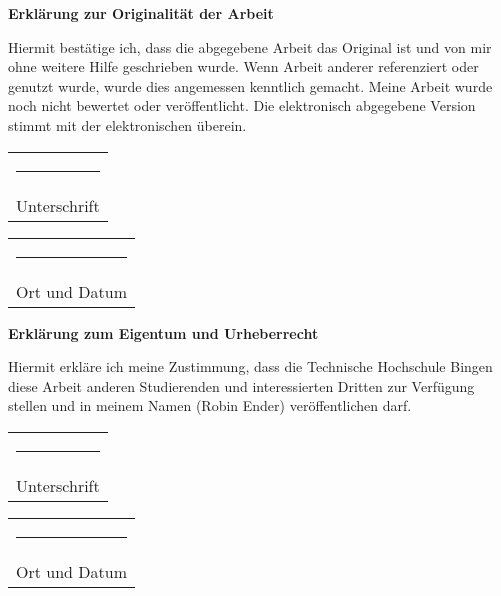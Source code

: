 \leavevmode
\vfill

\begin{center}
\textbf{Erklärung zur Originalität der Arbeit}
\end{center}
Hiermit bestätige ich, dass die abgegebene Arbeit das Original ist und von mir ohne weitere Hilfe geschrieben wurde. Wenn Arbeit anderer referenziert oder genutzt wurde, wurde dies angemessen kenntlich gemacht. Meine Arbeit wurde noch nicht bewertet oder veröffentlicht. Die elektronisch abgegebene Version stimmt mit der elektronischen überein.

\vspace{1cm}
\hfill
\begin{tabular}[t]{c}
  \rule{10em}{0.4pt}\\ Unterschrift
\end{tabular}
\hfill
\begin{tabular}[t]{c}
  \rule{10em}{0.4pt}\\ Ort und Datum
\end{tabular}
\hfill
\strut
\vspace{2cm}


\begin{center}
\textbf{Erklärung zum Eigentum und Urheberrecht}
\end{center}
Hiermit erkläre ich meine Zustimmung, dass die Technische Hochschule Bingen diese Arbeit anderen Studierenden und interessierten Dritten zur Verfügung stellen und in meinem Namen (Robin Ender) veröffentlichen darf.

\vspace{1cm}
\hfill
\begin{tabular}[t]{c}
  \rule{10em}{0.4pt}\\ Unterschrift
\end{tabular}
\hfill
\begin{tabular}[t]{c}
  \rule{10em}{0.4pt}\\ Ort und Datum
\end{tabular}
\hfill
\strut
\vfill

